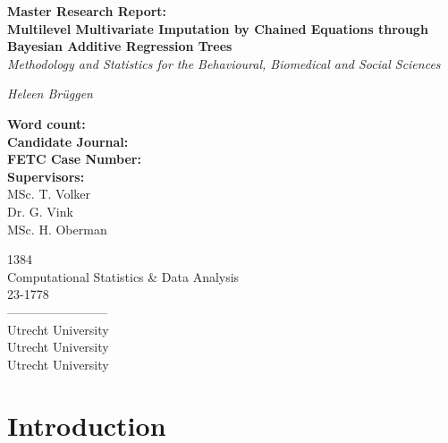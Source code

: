 \documentclass[10pt, a4paper, titlepage]{article}
\begin{document}
\begin{titlingpage}
\begin{center}
\Huge\textbf{Master Research Report:  \\ Multilevel Multivariate Imputation by Chained Equations through Bayesian Additive Regression Trees} \\
\Large\textit{Methodology and Statistics for the Behavioural, Biomedical and Social Sciences}

\vspace{.5cm}

\normalsize\textit{Heleen Brüggen}

\vspace{15cm}

\begin{minipage}{0.5\textwidth}
\begin{flushleft}

\textbf{Word count:} \\
\textbf{Candidate Journal:} \\
\textbf{FETC Case Number:} \\
\textbf{Supervisors:} \\
MSc. T. Volker \\
Dr. G. Vink \\
 MSc. H. Oberman
\end{flushleft}
\end{minipage}%
\begin{minipage}{0.5\textwidth}
\begin{flushright}

1384 \\
Computational Statistics \& Data Analysis \\
23-1778 \\
------------------------\\
Utrecht University \\
Utrecht University \\
Utrecht University
\end{flushright}
\end{minipage}

\end{center}
\end{titlingpage}

\newpage

\section{Introduction}
\end{document}
